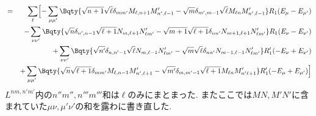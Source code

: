 \documentclass[10.5pt,a4paper]{jreport}
\begin{document}
\begin{eqnarray}
  &=&\sum_{\ell }\Bigl[\nonumber -\sum_{\mu\mu'}\Bqty{ \sqrt{n+1}\sqrt{\ell }\delta_{mm'}M_{\ell , n+1}M_{n', \ell -1}' -  \sqrt{m}\delta_{m', m-1}\sqrt{\ell }M_{\ell n}M_{n', \ell -1}'}R_1(E_\mu - E_{\mu'})\\
    \nonumber &&- \sum_{\nu\nu'}\Bqty{ \sqrt{n}\delta_{n', n-1}\sqrt{\ell +1}N_{m, \ell +1}N_{\ell m'}' -  \sqrt{m+1}\sqrt{\ell +1}\delta_{nn'}N_{m+1, \ell +1}N_{\ell m'}'}R_1(E_\nu - E_{\nu'})\\
    \nonumber &&+ \sum_{\nu\nu'}\Bqty{ \sqrt{n'}\delta_{n, n'-1}\sqrt{\ell }N_{m, \ell -1}N_{\ell m'}' -  \sqrt{m}\sqrt{\ell }\delta_{nn'}N_{m-1, \ell -1}N_{\ell m'}'}R_1'(-E_\nu + E_{\nu'})\\
    \nonumber&&+\sum_{\mu\mu'}\Bqty{ \sqrt{n}\sqrt{\ell +1}\delta_{mm'}M_{\ell , n-1}M_{n', \ell +1}' -  \sqrt{m'}\delta_{m, m'-1}\sqrt{\ell +1}M_{\ell n}M_{n'\ell +1}'}R_1'(- E_\mu + E_{\mu'})\Bigr]\\
\end{eqnarray}
$L^{nm, n'm'}$内の$n''m'', n'''m'''$和は$\ell$のみにまとまった. またここでは$MN, M'N'$に含まれていた$\mu\nu, \mu'\nu'$の和を露わに書き直した.
\end{document}

